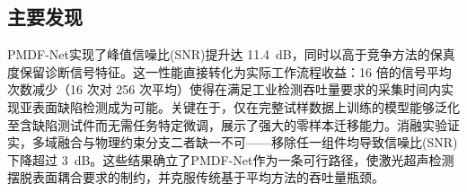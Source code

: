 \subsection{主要发现}
\label{sec:conclusion-findings}

PMDF-Net实现了峰值信噪比(SNR)提升达 \SI{11.4}{dB}，同时以高于竞争方法的保真度保留诊断信号特征。这一性能直接转化为实际工作流程收益：\num{16} 倍的信号平均次数减少（16 次对 256 次平均）使得在满足工业检测吞吐量要求的采集时间内实现亚表面缺陷检测成为可能。关键在于，仅在完整试样数据上训练的模型能够泛化至含缺陷测试件而无需任务特定微调，展示了强大的零样本迁移能力。消融实验证实，多域融合与物理约束分支二者缺一不可——移除任一组件均导致信噪比(SNR)下降超过 \SI{3}{dB}。这些结果确立了PMDF-Net作为一条可行路径，使激光超声检测摆脱表面耦合要求的制约，并克服传统基于平均方法的吞吐量瓶颈。
